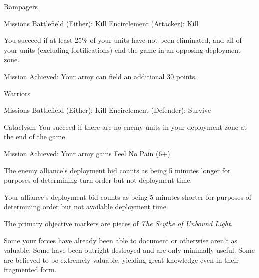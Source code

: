 \documentclass{40k}
\begin{document}
Rampagers

Missions
  Battlefield (Either): Kill
  Encirclement (Attacker): Kill

  You succeed if at least 25\% of your units have not been eliminated,
  and all of your units (excluding fortifications) end the game in
  an opposing deployment zone.

Mission Achieved:
  Your army can field an additional 30 points.


Warriors

Missions
  Battlefield (Either): Kill
  Encirclement (Defender): Survive

Cataclysm
  You succeed if there are no enemy units in your deployment zone at the end of the game.

Mission Achieved:
  Your army gains Feel No Pain (6+)



  The enemy alliance's deployment bid counts as being 5 minutes longer
  for purposes of determining turn order but not deployment time.

  Your alliance's deployment bid counts as being 5 minutes shorter for
  purposes of determining order but not available deployment time.


The primary objective markers are pieces of \emph{The Scythe of Unbound Light}.

Some your forces have already been able to document or otherwise
aren't as valuable.  Some have been outright destroyed and are only
minimally useful.  Some are believed to be extremely valuable,
yielding great knowledge even in their fragmented form.
\end{document}
